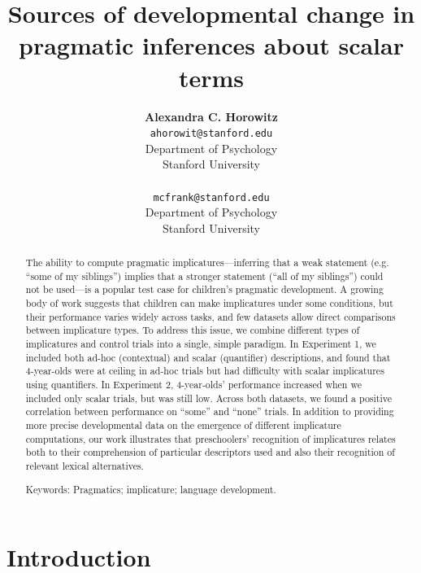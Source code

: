 \documentclass[10pt,letterpaper]{article}
\title{Sources of developmental change in pragmatic inferences about scalar terms}
\author{{\large \bf Alexandra C. Horowitz} \\ \texttt{ahorowit@stanford.edu}\\ Department of Psychology \\ Stanford University \\ 
\And {\large \bf Michael C. Frank} \\ \texttt{mcfrank@stanford.edu} \\ Department of Psychology \\ Stanford University \\ }
\begin{document}
\maketitle

\begin{abstract} 

The ability to compute pragmatic implicatures---inferring that a weak statement (e.g. ``some of my siblings'') implies that a stronger statement (``all of my siblings'') could not be used---is a popular test case for children's pragmatic development. A growing body of work suggests that children can make implicatures under some conditions, but their performance varies widely across tasks, and few datasets allow direct comparisons between implicature types. To address this issue, we combine different types of implicatures and control trials into a single, simple paradigm. In Experiment 1, we included both ad-hoc (contextual) and scalar (quantifier) descriptions, and found that 4-year-olds were at ceiling in ad-hoc trials but had difficulty with scalar implicatures using quantifiers.  In Experiment 2, 4-year-olds' performance increased when we included only scalar trials, but was still low. Across both datasets, we found a positive correlation between performance on ``some'' and ``none'' trials. In addition to providing more precise developmental data on the emergence of different implicature computations, our work illustrates that preschoolers' recognition of implicatures relates both to their comprehension of particular descriptors used and also their recognition of relevant lexical alternatives. 




{Keywords:} Pragmatics; implicature; language development. 
\end{abstract}

\section{Introduction}
\end{document}
